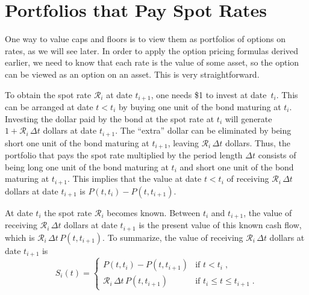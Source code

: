\section{Portfolios that Pay Spot Rates}\label{s_portfoliosspotrates}

One way to value caps and floors is to view them as portfolios of options on rates, as we will see later.  In order to apply the option pricing formulas derived earlier, we need to know that each rate is the value of some asset, so the option can be viewed as an option on an asset.  This is very straightforward.

To obtain the spot rate $\mathcal{R}_i$ at date $t_{i+1}$, one needs \$1 to invest at date~$t_i$.  This can be arranged at date $t<t_i$ by buying one unit of the bond maturing at $t_i$.  Investing the dollar paid by the bond at the spot rate at $t_i$ will generate $1+\mathcal{R}_i\,\varDelta t$ dollars at date $t_{i+1}$.  The ``extra'' dollar can be eliminated by being short one unit of the bond maturing at $t_{i+1}$, leaving $\mathcal{R}_i\,\varDelta t$ dollars.  Thus, the portfolio that pays the spot rate multiplied by the period length $\varDelta t$ consists of being long one unit of the bond maturing at $t_i$ and short one unit of the bond maturing at $t_{i+1}$.  
This implies that the value at date $t<t_i$ of receiving $\mathcal{R}_i\,\varDelta t$ dollars at date $t_{i+1}$ is $P(t,t_i)-P(t,t_{i+1})$.  

At date $t_i$ the spot rate $\mathcal{R}_i$ becomes known.  Between $t_i$ and $t_{i+1}$, the value of receiving $\mathcal{R}_i\,\varDelta t$ dollars at date $t_{i+1}$ is the present value of this known cash flow, which is $\mathcal{R}_i\,\varDelta t\,P(t, t_{i+1})$.  To summarize, the value of receiving $\mathcal{R}_i\,\varDelta t$ dollars at date $t_{i+1}$ is
\begin{equation}\label{S_i}
S_i(t) = \begin{cases} P(t,t_i)-P(t,t_{i+1}) & \text{if } t < t_{i}\; ,\\
\mathcal{R}_i\,\varDelta t\, P(t,t_{i+1}) & \text{if }  t_{i} \leq t \leq t_{i+1}\;. \end{cases}
\end{equation}
 
